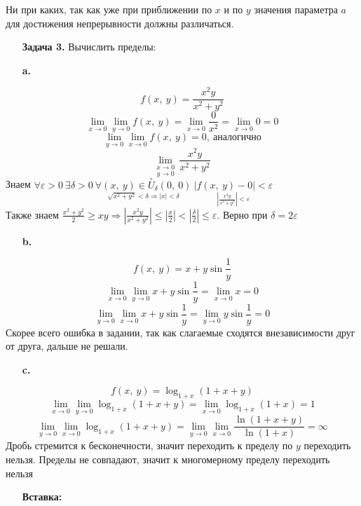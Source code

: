 \documentclass[12pt, letterpaper, twoside]{article}
\newcommand{\oo}{\infty}
\newcommand{\Abs}[1]{\left| #1 \right|}
\begin{document}
    Ни при каких, так как уже при приближении по $x$ и по $y$ значения параметра $a$ для достижения непрерывности должны различаться.
    \begin{enumerate}
        \item[\textbf{Задача 3.}] Вычислить пределы:
    \end{enumerate}
    \begin{enumerate}
        \item[\textbf{a.}]
    \end{enumerate}
    \[f(x,\ y) = \frac{x^2 y}{x^2 + y^2}\]\newpage
    \[\lim_{x\to 0}\lim_{y \to 0} f(x,\ y) = \lim_{x\to 0} \frac{0}{x^2} = \lim_{x\to 0} 0 = 0\]
    \[\lim_{y\to 0}\lim_{x\to 0} f(x,\ y) = 0,\ \text{аналогично}\]
    \[\underset{y\to 0}{\lim_{x\to 0}}\, \frac{x^2 y}{x^2 + y^2}\]
    Знаем $\forall \varepsilon > 0\ \exists \delta > 0\ \underset{\sqrt{x^2 + y^2} < \delta\Rightarrow |x|<\delta}{\forall (x,\ y)\in \overset{\circ}{U}_{\delta}(0,\ 0)}\ \underset{\Abs{\frac{x^2 y}{x^2 + y^2}} < \varepsilon}{\Abs{f(x,\ y) - 0} < \varepsilon}$\\
    Также знаем $\frac{x^2 + y^2}{2} \geq xy\Rightarrow \Abs{\frac{x^2 y}{x^2 + y^2}} \leq \Abs{\frac{x}{2}} < \Abs{\frac{\delta}{2}}\leq\varepsilon$. Верно при $\delta = 2\varepsilon$
    \begin{enumerate}
        \item[\textbf{b.}]
    \end{enumerate}
    \[f(x,\ y) = x + y\sin \frac{1}{y}\]
    \[\lim_{x\to 0}\lim_{y\to 0} x + y\sin \frac{1}{y} = \lim_{x\to 0} x = 0\]
    \[\lim_{y\to 0}\lim_{x\to 0} x + y\sin\frac{1}{y} = \lim_{y\to 0} y\sin \frac{1}{y} = 0\]
    Скорее всего ошибка в задании, так как слагаемые сходятся внезависимости друг от друга, дальше не решали.
    \begin{enumerate}
        \item[\textbf{c.}]
    \end{enumerate}
    \[f(x,\ y) = \log_{1 + x}(1 + x + y)\]
    \[\lim_{x\to 0}\lim_{y\to 0} \log_{1 + x}(1 + x + y) = \lim_{x\to 0} \log_{1 + x}(1 + x) = 1\]
    \[\lim_{y\to 0}\lim_{x\to 0} \log_{1 + x}(1 + x + y) = \lim_{y\to 0}\lim_{x \to 0} \frac{\ln(1 + x + y)}{\ln(1 + x)} = \oo\]
    Дробь стремится к бесконечности, значит переходить к пределу по $y$ переходить нельзя. Пределы не совпадают, значит к многомерному пределу переходить нельзя\newpage
    \begin{enumerate}
        \item[\textbf{Вставка:}]
    \end{enumerate}
\end{document}
